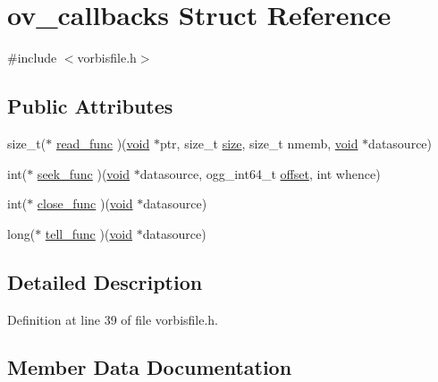 \hypertarget{structov__callbacks}{}\section{ov\+\_\+callbacks Struct Reference}
\label{structov__callbacks}


{\ttfamily \#include $<$vorbisfile.\+h$>$}

\subsection*{Public Attributes}
\begin{DoxyCompactItemize}
\item 
size\+\_\+t($\ast$ \mbox{\hyperlink{structov__callbacks_a301b93b9f0436e5bde6dbdeb0edeae77}{read\+\_\+func}} )(\mbox{\hyperlink{_s_d_l__opengles2__gl2ext_8h_ae5d8fa23ad07c48bb609509eae494c95}{void}} $\ast$ptr, size\+\_\+t \mbox{\hyperlink{_s_d_l__opengl__glext_8h_a3d1e3edfcf61ca2d831883e1afbad89e}{size}}, size\+\_\+t nmemb, \mbox{\hyperlink{_s_d_l__opengles2__gl2ext_8h_ae5d8fa23ad07c48bb609509eae494c95}{void}} $\ast$datasource)
\item 
int($\ast$ \mbox{\hyperlink{structov__callbacks_aa49d8079756c1c26e2ba9b974e463dfa}{seek\+\_\+func}} )(\mbox{\hyperlink{_s_d_l__opengles2__gl2ext_8h_ae5d8fa23ad07c48bb609509eae494c95}{void}} $\ast$datasource, ogg\+\_\+int64\+\_\+t \mbox{\hyperlink{_s_d_l__opengl__glext_8h_ac915cd848f42b26af51745f204a3b9af}{offset}}, int whence)
\item 
int($\ast$ \mbox{\hyperlink{structov__callbacks_a4d1141e00251a23b27e1de261e8717ec}{close\+\_\+func}} )(\mbox{\hyperlink{_s_d_l__opengles2__gl2ext_8h_ae5d8fa23ad07c48bb609509eae494c95}{void}} $\ast$datasource)
\item 
long($\ast$ \mbox{\hyperlink{structov__callbacks_ab078f3f386b7c58e9fab2ede904e0e36}{tell\+\_\+func}} )(\mbox{\hyperlink{_s_d_l__opengles2__gl2ext_8h_ae5d8fa23ad07c48bb609509eae494c95}{void}} $\ast$datasource)
\end{DoxyCompactItemize}


\subsection{Detailed Description}


Definition at line 39 of file vorbisfile.\+h.



\subsection{Member Data Documentation}
\mbox{\label{structov__callbacks_a4d1141e00251a23b27e1de261e8717ec}} 
